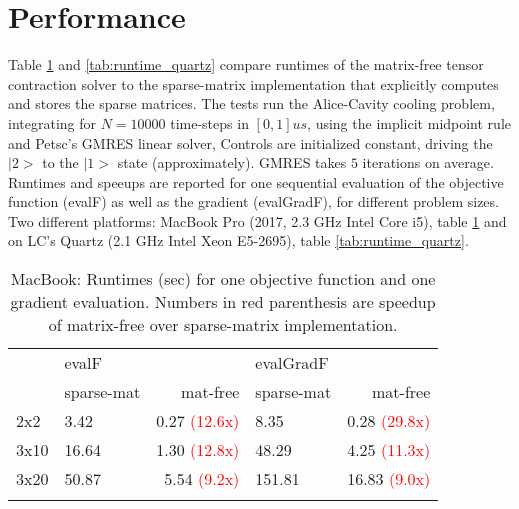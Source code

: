 \documentclass[letterpaper]{article}
\begin{document}
\section{Performance}
Table \ref{tab:runtime_mac} and \ref{tab:runtime_quartz} compare runtimes of the matrix-free tensor contraction solver to the sparse-matrix implementation that explicitly computes and stores the sparse matrices. The tests run the Alice-Cavity cooling problem, integrating for $N=10000$ time-steps in $[0,1]us$, using the implicit midpoint rule and Petsc's GMRES linear solver, Controls are initialized constant, driving the $|2>$ to the $|1>$ state (approximately). GMRES takes $5$ iterations on average. 
Runtimes and speeups are reported for one sequential evaluation of the objective function (evalF) as well as the gradient (evalGradF), for different problem sizes. Two different platforms: MacBook Pro (2017, 2.3 GHz Intel Core i5), table \ref{tab:runtime_mac} and on LC's Quartz (2.1 GHz Intel Xeon E5-2695), table \ref{tab:runtime_quartz}.

\begin{table}[h]
  \begin{tabular}{l|lr|lr}
    \hline\noalign{\smallskip}
         & evalF &    &  evalGradF &\\
         & sparse-mat & mat-free & sparse-mat& mat-free  \\
    \noalign{\smallskip}\hline\noalign{\smallskip}
    2x2  & 3.42   & 0.27 \textcolor{red}{(12.6x)}  & 8.35  &  0.28 \textcolor{red}{(29.8x)}  \\
    3x10 & 16.64  & 1.30  \textcolor{red}{(12.8x)} & 48.29 &  4.25 \textcolor{red}{(11.3x)}  \\
    3x20 &  50.87 & 5.54  \textcolor{red}{(9.2x)}  & 151.81 & 16.83 \textcolor{red}{ (9.0x)} \\
    \noalign{\smallskip}\hline
  \end{tabular}
  \caption{MacBook: Runtimes (sec) for one objective function and one gradient evaluation. Numbers in red parenthesis are speedup of matrix-free over sparse-matrix implementation.}
  \label{tab:runtime_mac} 
\end{table}
\end{document}
